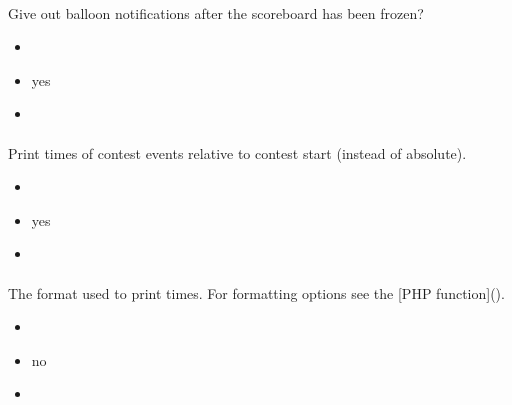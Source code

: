 \documentclass[a4paper,10pt,english,openany]{sphinxmanual}
\begin{document}
\paragraph{}
\label{\detokenize{configuration-reference:show-balloons-postfreeze}}
\sphinxAtStartPar
Give out balloon notifications after the scoreboard has been frozen?
\begin{itemize}
\item {} 
\sphinxAtStartPar
{} 

\item {} 
\sphinxAtStartPar
{} yes

\item {} 
\sphinxAtStartPar
{} 

\end{itemize}


\paragraph{}
\label{\detokenize{configuration-reference:show-relative-time}}
\sphinxAtStartPar
Print times of contest events relative to contest start (instead of absolute).
\begin{itemize}
\item {} 
\sphinxAtStartPar
{} 

\item {} 
\sphinxAtStartPar
{} yes

\item {} 
\sphinxAtStartPar
{} 

\end{itemize}


\paragraph{}
\label{\detokenize{configuration-reference:time-format}}
\sphinxAtStartPar
The format used to print times. For formatting options see the {[}PHP  function{]}().
\begin{itemize}
\item {} 
\sphinxAtStartPar
{} 

\item {} 
\sphinxAtStartPar
{} no

\item {} 
\sphinxAtStartPar
{} 

\end{itemize}
\end{document}
